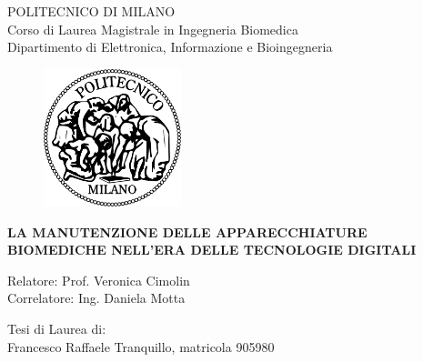 \documentclass[10pt,]{article}
\title{}
\author{}
\date{}
\begin{document}

\thispagestyle{empty} \vspace*{-2cm}

\begin{center}
  \large
  POLITECNICO DI MILANO\\
  \large
  Corso di Laurea Magistrale in Ingegneria Biomedica\\
  Dipartimento di Elettronica, Informazione e Bioingegneria\\
  \vspace*{1cm}
  \begin{figure}[htbp]
    \begin{center}
      \includegraphics[width=4cm]{img/polimi}
    \end{center}
  \end{figure}
  \vspace*{1cm} \LARGE



  \textbf{LA MANUTENZIONE DELLE APPARECCHIATURE BIOMEDICHE NELL'ERA DELLE TECNOLOGIE DIGITALI}\\




\end{center}

\vspace*{1cm} \large

\begin{flushleft}


  Relatore: Prof. Veronica Cimolin \\
  Correlatore: Ing. Daniela Motta 

\end{flushleft}

\vspace*{1.0cm}

\begin{flushright}


  Tesi di Laurea di:\\ Francesco Raffaele Tranquillo, matricola 905980 \\


\end{flushright}
\end{document}
